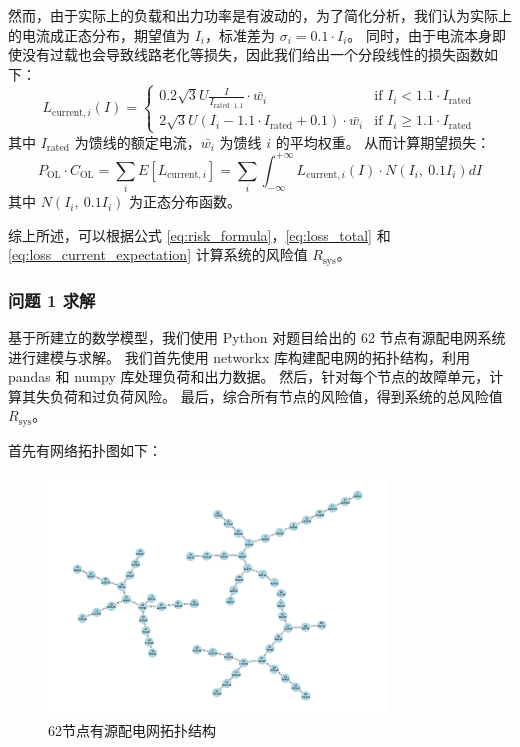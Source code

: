 \documentclass{article}
\begin{document}
然而，由于实际上的负载和出力功率是有波动的，为了简化分析，我们认为实际上的电流成正态分布，期望值为 $I_i$，标准差为 $\sigma_i = 0.1 \cdot I_i$。
同时，由于电流本身即使没有过载也会导致线路老化等损失，因此我们给出一个分段线性的损失函数如下：
\begin{equation}\label{eq:loss_current}
  L_{\text{current},i} (I) =
  \begin{cases}
    0.2 \sqrt{3} U \frac{I}{I_{\text{rated} \cdot 1.1}} \cdot \bar{w_i} & \text{if } I_i < 1.1 \cdot I_{\text{rated}} \\
    2 \sqrt{3} U (I_i - 1.1 \cdot I_{\text{rated}} + 0.1) \cdot \bar{w_i} & \text{if } I_i \geq 1.1 \cdot I_{\text{rated}}
  \end{cases}
\end{equation}
其中 $I_{\text{rated}}$ 为馈线的额定电流，$\bar{w_i}$ 为馈线 $i$ 的平均权重。
从而计算期望损失：
\begin{equation}\label{eq:loss_current_expectation}
  P_{\text{OL}} \cdot C_{\text{OL}}
  = \sum_i E[L_{\text{current},i}]
  = \sum_i \int_{-\infty}^{+\infty} L_{\text{current},i}(I) \cdot N(I_i,\ 0.1 I_i) dI
\end{equation}
其中 $N(I_i,\ 0.1 I_i)$ 为正态分布函数。

综上所述，可以根据公式 \ref{eq:risk_formula}，\ref{eq:loss_total} 和 \ref{eq:loss_current_expectation} 计算系统的风险值 $R_{\text{sys}}$。

\subsubsection{问题 1 求解}\label{subsubsec:problem1_solve}

基于所建立的数学模型，我们使用 Python 对题目给出的 62 节点有源配电网系统进行建模与求解。
我们首先使用 networkx 库构建配电网的拓扑结构，利用 pandas 和 numpy 库处理负荷和出力数据。
然后，针对每个节点的故障单元，计算其失负荷和过负荷风险。
最后，综合所有节点的风险值，得到系统的总风险值 $R_{\text{sys}}$。

首先有网络拓扑图如下：

\begin{figure}[htbp]
  \centering
  \includegraphics[width=0.8\textwidth]{problem1/topology_graph.png}
  \caption{62节点有源配电网拓扑结构}
  \label{fig:network_topology}
\end{figure}
\end{document}

